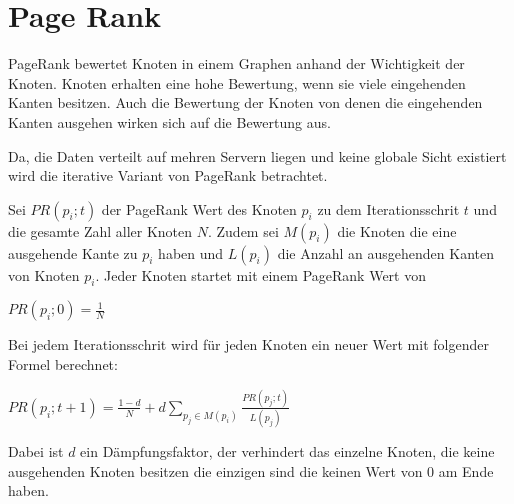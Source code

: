 \section{Page Rank}

PageRank bewertet Knoten in einem Graphen anhand der Wichtigkeit der Knoten. Knoten erhalten eine hohe Bewertung, wenn sie viele eingehenden Kanten besitzen. Auch die Bewertung der Knoten von denen die eingehenden Kanten ausgehen wirken sich auf die Bewertung aus.

Da, die Daten verteilt auf mehren Servern liegen und keine globale Sicht existiert wird die iterative Variant von PageRank betrachtet.


Sei $ PR(p_{i}; t)$ der PageRank Wert des Knoten $p_{i}$ zu dem Iterationsschrit $t$ und die gesamte Zahl aller Knoten $N$.
Zudem sei $M(p_{i})$ die Knoten die eine ausgehende Kante zu $p_{i}$ haben und $L(p_{i})$ die Anzahl an ausgehenden Kanten von Knoten $p_{i}$.
Jeder Knoten startet mit einem PageRank Wert von

$ PR(p_{i}; 0) = \frac{1}{N} $

Bei jedem Iterationsschrit wird für jeden Knoten ein neuer Wert mit folgender Formel berechnet:

$PR(p_{i}; t+1) = \frac{1 - d}{N} + d \sum_{p_{j} \in M(p_{i})} \frac{PR(p_{j}; t)}{L(p_{j})} $


Dabei ist $d$ ein Dämpfungsfaktor, der verhindert das einzelne Knoten, die keine ausgehenden Knoten besitzen die einzigen sind die keinen Wert von 0 am Ende haben.
